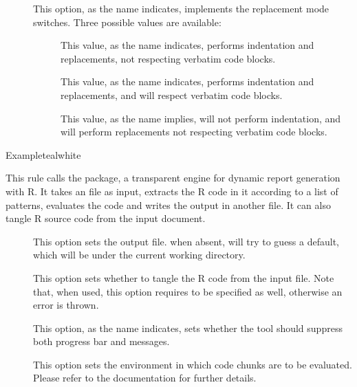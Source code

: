 \begin{description}
\begin{description}
\item[] This option, as the name indicates, implements the replacement mode switches. Three possible values are available:

\begin{description}
\item[] This value, as the name indicates, performs indentation and replacements, not respecting verbatim code blocks.

\item[] This value, as the name indicates, performs indentation and replacements, and will respect verbatim code blocks.

\item[] This value, as the name implies, will not perform indentation, and will perform replacements not respecting verbatim code blocks.
\end{description}
\end{description}

\begin{codebox}{Example}{teal}{\icnote}{white}
\end{codebox}

\item[\rulebox{knitr}]
This rule calls the  package, a transparent engine for dynamic report generation with R. It takes an  file as input, extracts the R code in it according to a list of patterns, evaluates the code and writes the output in another file. It can also tangle R source code from the input document.

\begin{description}
\item[] This option sets the output file. when absent,  will try to guess a default, which will be under the current working directory.

\item[] This option sets whether to tangle the R code from the input file. Note that, when used, this option requires  to be specified as well, otherwise an error is thrown.

\item[] This option, as the name indicates, sets whether the tool should suppress both progress bar and messages.

\item[] This option sets the environment in which code chunks are to be evaluated. Please refer to the documentation for further details.


\end{description}
\end{description}
